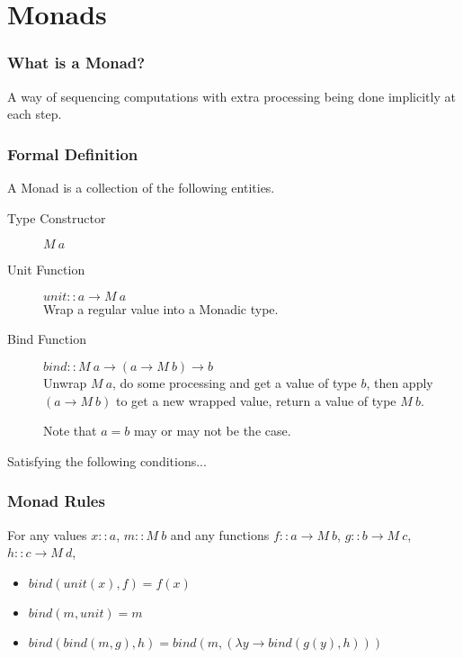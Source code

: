 \documentclass[presentation.tex]{subfiles}
\begin{document}
\section{Monads}
\begin{frame}
  \frametitle{What is a Monad?}

  A way of sequencing computations with extra processing being done
  implicitly at each step.


\end{frame}

\begin{frame}
  \frametitle{Formal Definition}

  A Monad is a collection of the following entities.

  \begin{description}
  \item[Type Constructor]
    $M\ a$

  \item[Unit Function]
    $unit::a\rightarrow M\ a$\\
    Wrap a regular value into a Monadic type.

  \item[Bind Function]
    $bind::M\ a\rightarrow(a\rightarrow M\ b)\rightarrow b$\\
    Unwrap $M\ a$, do some processing and get a value of type $b$,
    then apply $(a\rightarrow M\ b)$ to get a new wrapped value,
    return a value of type $M\ b$.

    Note that $a=b$ may or may not be the case.
  \end{description}

  Satisfying the following conditions...
\end{frame}

\begin{frame}
  \frametitle{Monad Rules}
  For any values $x::a$, $m::M\ b$ and any functions $f::a \rightarrow M\ b$, $g::b \rightarrow M\ c$, $h::c \rightarrow M\ d$,
  \begin{itemize}
  \item
    $bind(unit(x), f) = f(x)$
  \item
    $bind(m, unit) = m$
  \item
    $bind(bind(m, g), h) = bind(m, (\lambda y \rightarrow bind(g(y), h)))$
  \end{itemize}
\end{frame}
\end{document}
